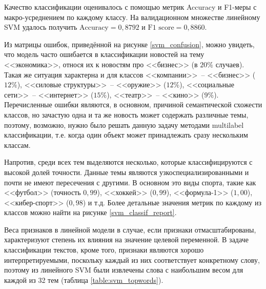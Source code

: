 \documentclass[a4paper, 14pt]{extarticle}
\begin{document}
Качество классификации оценивалось с помощью метрик Accuracy и F1-меры с макро-усреднением по каждому классу.
На валидационном множестве линейному SVM удалось получить $\text{Accuracy} = 0,8792$ и $\text{F1 score} = 0,8860$.

Из матрицы ошибок, приведённой на рисунке \ref{svm_confusion}, можно увидеть, что модель часто ошибается в классификации новостей на тему
<<экономика>>, относя их к новостям про <<бизнес>> (в $20\%$ случаев). Такая же ситуация характерна и для классов <<компании>>~-- 
<<бизнес>> ($12\%$), <<силовые структуры>>~-- <<оружие>> ($12\%$),  <<социальные сети>>~-- <<интернет>> ($15\%$), <<театр>>~-- 
<<кино>> ($9\%$). Перечисленные ошибки являются, в основном, причиной семантической схожести классов, но зачастую одна и та же 
новость может содержать различные темы, поэтому, возможно, нужно было решать данную задачу методами multilabel классификации, т.е. 
когда один объект может принадлежать сразу
нескольким классам.

Напротив, среди всех тем выделяются несколько, которые классифицируются с высокой долей точности. Данные темы 
являются узкоспециализированными и почти не имеют пересечения с другими. В основном это виды спорта, такие как <<футбол>> (точность 
$0,99$), <<хоккей>> ($0,99$), <<формула-1>> ($1,00$), <<кибер-спорт>> ($0,98$) и т.д. Более детальные
значения метрик по каждому из классов можно найти на рисунке \ref{svm_classif_report}.

Веса признаков в линейной модели в случае, если признаки отмасштабированы, характеризуют степень их влияния на значение целевой 
переменной. В задаче классификации текстов, кроме того, признаки являются хорошо интерпретируемыми, поскольку каждый из них 
соответствует конкретному слову, поэтому из линейного SVM были извлечены слова с наибольшим весом для каждой из 32 тем (таблица \ref{table:svm_topwords}). 
%
%
%
%
%
%
%
%
\end{document}
